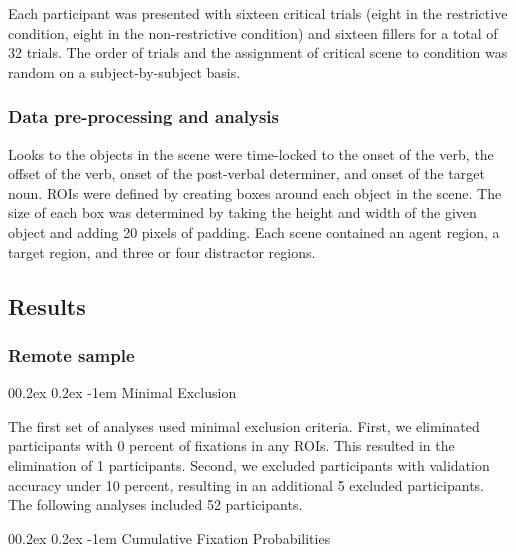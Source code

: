 \documentclass[
  man,floatsintext]{apa6}
\makeatletter
\let\oldparagraph\paragraph
\renewcommand{\paragraph}[1]{\oldparagraph{#1}\mbox{}}
\renewcommand{\paragraph}{\@startsection{paragraph}{4}{\parindent}%
  {0\baselineskip \@plus 0.2ex \@minus 0.2ex}%
  {-1em}%
  {\normalfont\normalsize\bfseries\itshape\typesectitle}}
\makeatother
\begin{document}
Each participant was presented with sixteen critical trials (eight in
the restrictive condition, eight in the non-restrictive condition) and
sixteen fillers for a total of 32 trials. The order of trials and the
assignment of critical scene to condition was random on a
subject-by-subject basis.

\hypertarget{data-pre-processing-and-analysis}{%
\subsubsection{Data pre-processing and analysis}\label{data-pre-processing-and-analysis}}

Looks to the objects in the scene were time-locked to the onset of the
verb, the offset of the verb, onset of the post-verbal determiner, and
onset of the target noun. ROIs were defined by creating boxes around each object in the scene. The size of each box was determined by taking the height and width of the given object and adding 20 pixels of padding. Each scene contained an agent region, a target region, and three or four distractor regions.

\hypertarget{results}{%
\subsection{Results}\label{results}}

\hypertarget{remote-sample-1}{%
\subsubsection{Remote sample}\label{remote-sample-1}}

\hypertarget{minimal-exclusion}{%
\paragraph{Minimal Exclusion}\label{minimal-exclusion}}

The first set of analyses used minimal exclusion criteria. First, we eliminated participants with 0 percent of fixations in any ROIs. This resulted in the elimination of 1 participants. Second, we excluded participants with validation accuracy under 10 percent, resulting in an additional 5 excluded participants. The following analyses included 52 participants.

\hypertarget{cumulative-fixation-probabilities}{%
\paragraph{Cumulative Fixation Probabilities}\label{cumulative-fixation-probabilities}}
\end{document}
